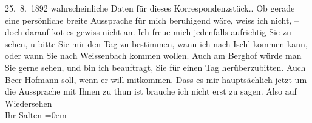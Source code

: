 \begin{ledgroupsized}[t]{13cm}
{{{                     25. 8. 1892 wahrscheinliche Daten für dieses
                  Korrespondenzstück.}}}\label{K_L03114-1h}. Ob gerade eine persönliche breite Aussprache für mich
               beruhigend wäre, weiss ich nicht, – doch darauf ko{\geminationm}t es
               gewiss nicht an. Ich freue mich jedenfalls aufrichtig Sie zu sehen, u bitte Sie mir
               den Tag zu bestimmen, wann ich nach Ischl kommen
               kann, oder wann Sie nach Weissenbach kommen
               wollen. Auch {\pb}am Berghof würde man Sie gerne sehen, und bin ich beauftragt, Sie für
               einen Tag herüberzubitten. Auch Beer-Hofmann soll, wenn
               er will mitkommen. Dass es mir hauptsächlich jetzt um die Aussprache mit Ihnen zu
               thun ist brauche ich nicht erst zu sagen.\pend
           \pstart
           Also auf Wiedersehen {\\[\baselineskip]}Ihr \spacefill\mbox{Salten}\pend
           \leftskip=0em{}
         
         \endnumbering{}\end{ledgroupsized}\begin{anhang}\end{anhang}\newcommand{\dateiname}{L03114}\newcommand{\titel}{Felix Salten an Arthur Schnitzler, [24. oder 25.? 8. 1892]}\newcommand{\editorInnen}{Martin Anton Müller und Laura Untner}
      